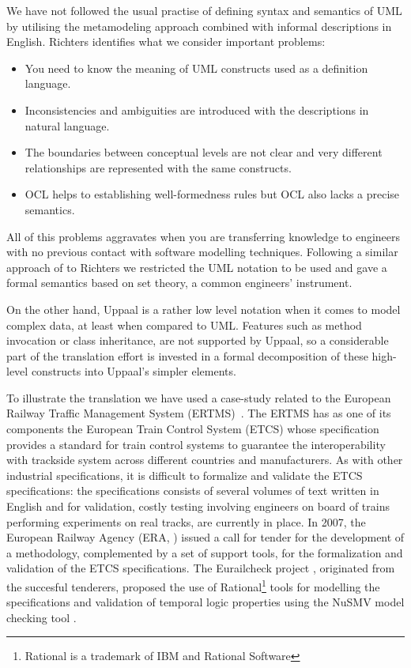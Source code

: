 We have not followed the usual practise of defining syntax and semantics
of UML by utilising the metamodeling approach combined with informal
descriptions in English. Richters \cite{ri:2002:pavumoc} identifies
what we consider important problems:
\begin{itemize}
\item You need to know the meaning of UML constructs used as a
  definition language.
\item Inconsistencies and ambiguities are introduced with the
  descriptions in natural language.
\item The boundaries between conceptual levels are not clear and very
  different relationships are represented with the same constructs.
\item OCL helps to establishing well-formedness rules but OCL also
  lacks a precise semantics.
\end{itemize}
All of this problems aggravates when you are transferring knowledge to
engineers with no previous contact with software modelling
techniques. Following a similar approach of to Richters we restricted
the UML notation to be used and gave a formal semantics based on set
theory, a common engineers' instrument.


On the other hand, Uppaal is a rather low level notation when it comes
to model complex data, at least when compared to UML. Features such as
method invocation or class inheritance, are not supported by Uppaal, so
a considerable part of the translation effort is invested in a formal
decomposition of these high-level constructs into Uppaal's simpler
elements. 

To illustrate the translation we have used a case-study related to the
European Railway Traffic Management System
(ERTMS)~\cite{SRS:subset26:v2.3.0}. The ERTMS has as one of its
components the European Train Control System (ETCS) whose
specification provides a standard for train control systems to
guarantee the interoperability with trackside system across different
countries and manufacturers. As with other industrial specifications,
it is difficult to formalize and validate the ETCS specifications: the
specifications consists of several volumes of text written in English
and for validation, costly testing involving engineers on board of
trains performing experiments on real tracks, are currently in
place. In 2007, the European Railway Agency (ERA, \cite{web:era})
issued a call for tender for the development of a methodology,
complemented by a set of support tools, for the formalization and
validation of the ETCS specifications. The Eurailcheck project
\cite{web:eurailcheck}, originated from the succesful tenderers,
proposed the use of Rational\footnote{Rational is a trademark of IBM
  and Rational Software} tools for modelling the specifications and
validation of temporal logic properties using the NuSMV model checking
tool \cite{web:nusmv}.

